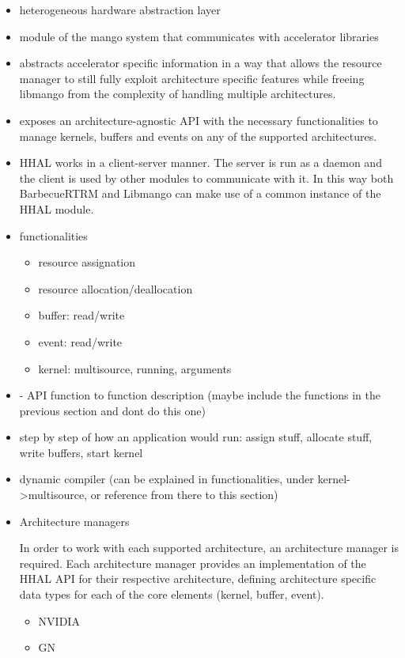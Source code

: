 \begin{itemize}
    \item heterogeneous hardware abstraction layer
    \item module of the mango system that communicates with accelerator libraries
    \item abstracts accelerator specific information in a way that allows the resource manager to still fully exploit architecture specific features while freeing libmango from the complexity of handling multiple architectures.
    \item exposes an architecture-agnostic API with the necessary functionalities to manage kernels, buffers and events on any of the supported architectures.
    \item HHAL works in a client-server manner. The server is run as a daemon and the client is used by other modules to communicate with it. In this way both BarbecueRTRM and Libmango can make use of a common instance of the HHAL module.
    \item functionalities
    \begin{itemize}
        \item resource assignation
        \item resource allocation/deallocation
        \item buffer: read/write
        \item event: read/write
        \item kernel: multisource, running, arguments
    \end{itemize}
    \item - API function to function description (maybe include the functions in the previous section and dont do this one)
    \item step by step of how an application would run: assign stuff, allocate stuff, write buffers, start kernel
    \item dynamic compiler (can be explained in functionalities, under kernel->multisource, or reference from there to this section)
    \item Architecture managers

    In order to work with each supported architecture, an architecture manager is required. Each architecture manager provides an implementation of the HHAL API for their respective architecture, defining architecture specific data types for each of the core elements (kernel, buffer, event). 
    \begin{itemize}
        \item NVIDIA
        \item GN 
    \end{itemize}
\end{itemize}

